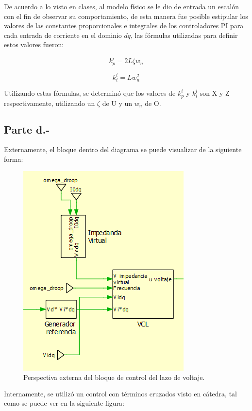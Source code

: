 De acuerdo a lo visto en clases, al modelo físico se le dio de entrada un escalón con el fin de observar su comportamiento, de esta manera fue posible estipular los valores de las constantes proporcionales e integrales de los controladores PI para cada entrada de corriente en el dominio $dq$, las fórmulas utilizadas para definir estos valores fueron:

\begin{equation}
    k_p^i = 2L\zeta w_{n}
\end{equation}

\begin{equation}
    k_i^i = Lw_{n}^2
\end{equation}

Utilizando estas fórmulas, se determinó que los valores de $k_p^i$ y $k_i^i$ son X y Z respectivamente, utilizando un $\zeta$ de U y un $w_{n}$ de O.

\subsection{Parte d.-}

Externamente, el bloque dentro del diagrama se puede visualizar de la siguiente forma:

\begin{figure}
   \centering
   \includegraphics[width=0.5\linewidth]{Tarea 1/report/imagenes/p1d/vcl bloque externo.png}
   \caption{Perspectiva externa del bloque de control del lazo de voltaje.}
   \label{vcl externo}
\end{figure}

Internamente, se utilizó un control con términos cruzados visto en cátedra, tal como se puede ver en la siguiente figura:

